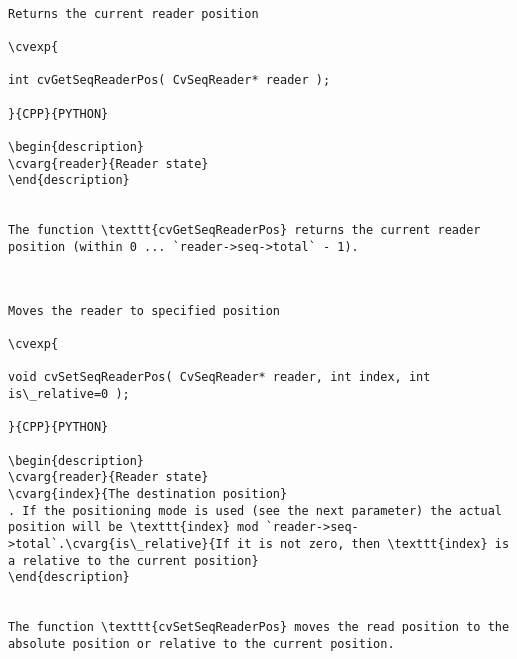 \begin{verbatim}

Returns the current reader position

\cvexp{

int cvGetSeqReaderPos( CvSeqReader* reader );

}{CPP}{PYTHON}

\begin{description}
\cvarg{reader}{Reader state}
\end{description}


The function \texttt{cvGetSeqReaderPos} returns the current reader position (within 0 ... `reader->seq->total` - 1).


\end{verbatim}
\begin{verbatim}

Moves the reader to specified position

\cvexp{

void cvSetSeqReaderPos( CvSeqReader* reader, int index, int is\_relative=0 );

}{CPP}{PYTHON}

\begin{description}
\cvarg{reader}{Reader state}
\cvarg{index}{The destination position}
. If the positioning mode is used (see the next parameter) the actual position will be \texttt{index} mod `reader->seq->total`.\cvarg{is\_relative}{If it is not zero, then \texttt{index} is a relative to the current position}
\end{description}


The function \texttt{cvSetSeqReaderPos} moves the read position to the absolute position or relative to the current position.


\end{verbatim}
